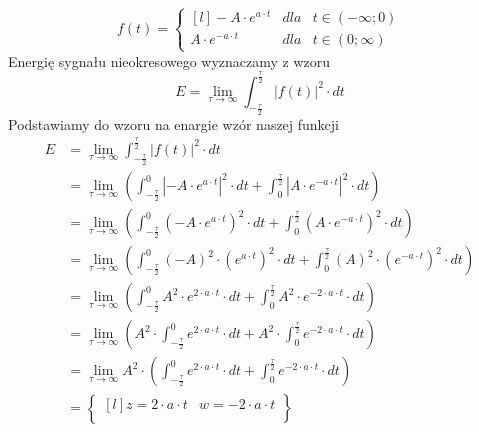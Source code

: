 \begin{equation}
f(t) = \left\{\begin{matrix*}[l]
-A \cdot e^{a\cdot t} & dla & t \in \left(-\infty; 0\right)\\
A \cdot e^{-a\cdot t} & dla & t \in \left(0; \infty\right)
\end{matrix*}\right.
\end{equation}
Energię sygnału nieokresowego wyznaczamy z wzoru
\begin{equation}
E=\lim_{\tau \rightarrow \infty}\int_{-\frac{\tau}{2}}^{\frac{\tau}{2}}\left|f(t)\right|^2 \cdot dt
\end{equation}
Podstawiamy do wzoru na enargie wzór naszej funkcji
\begin{align*}
E&=\lim_{\tau \rightarrow \infty}\int_{-\frac{\tau}{2}}^{\frac{\tau}{2}}\left|f(t)\right|^2 \cdot dt\\
 &=\lim_{\tau \rightarrow \infty} \left( 
   \int_{-\frac{\tau}{2}}^{0}\left| -A \cdot e^{a\cdot t} \right|^2 \cdot dt 
 + \int_{0}^{\frac{\tau}{2}}\left| A \cdot e^{-a\cdot t} \right|^2 \cdot dt \right)\\
 &=\lim_{\tau \rightarrow \infty} \left( 
   \int_{-\frac{\tau}{2}}^{0}\left( -A \cdot e^{a\cdot t} \right)^2 \cdot dt 
 + \int_{0}^{\frac{\tau}{2}}\left( A \cdot e^{-a\cdot t} \right)^2 \cdot dt \right)\\
 &=\lim_{\tau \rightarrow \infty} \left( 
   \int_{-\frac{\tau}{2}}^{0}\left( -A\right)^2 \cdot \left(e^{a\cdot t} \right)^2 \cdot dt 
 + \int_{0}^{\frac{\tau}{2}}\left( A \right)^2 \cdot \left(e^{-a\cdot t} \right)^2 \cdot dt \right)\\
 &=\lim_{\tau \rightarrow \infty} \left( 
   \int_{-\frac{\tau}{2}}^{0} A^2 \cdot e^{2\cdot a\cdot t} \cdot dt 
 + \int_{0}^{\frac{\tau}{2}} A^2 \cdot e^{-2 \cdot a\cdot t} \cdot dt \right)\\
 &=\lim_{\tau \rightarrow \infty} \left( 
    A^2 \cdot \int_{-\frac{\tau}{2}}^{0}  e^{2\cdot a\cdot t} \cdot dt 
 +  A^2 \cdot \int_{0}^{\frac{\tau}{2}} e^{-2 \cdot a\cdot t} \cdot dt \right)\\
 &=\lim_{\tau \rightarrow \infty} A^2 \cdot \left( 
   \int_{-\frac{\tau}{2}}^{0}  e^{2\cdot a\cdot t} \cdot dt 
 + \int_{0}^{\frac{\tau}{2}} e^{-2 \cdot a\cdot t} \cdot dt \right)\\
 &=\begin{Bmatrix*}[l]
   z=2\cdot a \cdot t & w=-2 \cdot a \cdot t\\

\end{Bmatrix*}
\end{align*}
